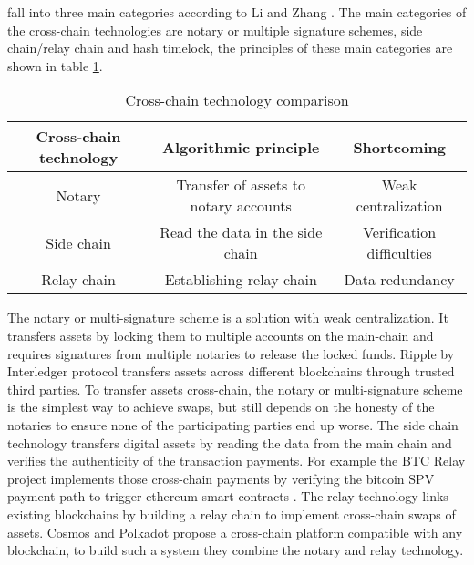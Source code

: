 fall into three main categories according to Li and Zhang \cite{li2019research}. The main categories of the cross-chain technologies are notary or multiple signature schemes, side chain/relay chain and hash timelock, the principles of these main categories are shown in table \ref{table:1}. \newline

\begin{table}[h!]
	\centering
	\begin{tabular}{|c | c | c |} 
		\hline 
		Cross-chain technology & Algorithmic principle & Shortcoming \\ [0.5ex] 
		\hline \hline
		Notary & Transfer of assets to notary accounts & Weak centralization  \\ 
		\hline
		Side chain & Read the data in the side chain & Verification difficulties  \\
		\hline
		Relay chain & Establishing relay chain & Data redundancy  \\ [1ex] 
		\hline
	\end{tabular}
	\caption{Cross-chain technology comparison}
	\label{table:1}
\end{table}

The notary or multi-signature scheme is a solution with weak centralization. It transfers assets by locking them to multiple accounts on the main-chain and requires signatures from multiple notaries to release the locked funds. Ripple by Interledger protocol \cite{hope2016interledger} transfers assets across different blockchains through trusted third parties. To transfer assets cross-chain, the notary or multi-signature scheme is the simplest way to achieve swaps, but still depends on the honesty of the notaries to ensure none of the participating parties end up worse. The side chain technology transfers digital assets by reading the data from the main chain and verifies the authenticity of the transaction payments. For example the BTC Relay \cite{btcrelay} project implements those cross-chain payments by verifying the bitcoin \ac{SPV} payment path to trigger ethereum smart contracts \cite{buterin2014ethereum}. The relay technology links existing blockchains by building a relay chain to implement cross-chain swaps of assets. Cosmos \cite{kwon2018network} and Polkadot \cite{wood2016polkadot} propose a cross-chain platform compatible with any blockchain, to build such a system they combine the notary and relay technology. \newline \newline



